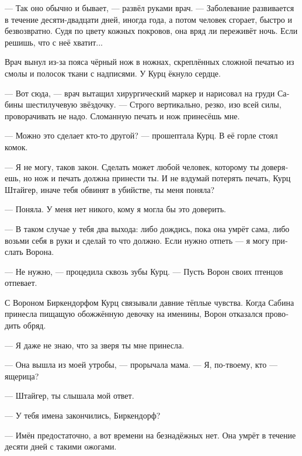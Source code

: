\documentclass[a4paper,12pt,fleqn]{book}\usepackage{polyglossia}\setdefaultlanguage[babelshorthands=true]{russian}\setotherlanguage{english}\defaultfontfeatures{Ligatures=TeX,Mapping=tex-text}\usepackage{xcolor}\newcommand{\ml}[3]{#2}
\begin{document}
--- Так оно обычно и бывает, --- развёл руками врач.
--- Заболевание развивается в течение десяти-двадцати дней, иногда года, а потом человек сгорает, быстро и безвозвратно.
Судя по цвету кожных покровов, она вряд ли переживёт ночь.
Если решишь, что с неё хватит...

Врач вынул из-за пояса чёрный нож в ножнах, скреплённых сложной печатью из смолы и полосок ткани с надписями.
У Курц ёкнуло сердце.

--- Вот сюда, --- врач вытащил хирургический маркер и нарисовал на груди Сабины шестилучевую звёздочку.
--- Строго вертикально, резко, изо всей силы, проворачивать не надо.
Сломанную печать и нож принесёшь мне.

--- Можно это сделает кто-то другой? --- прошептала Курц.
В её горле стоял комок.

--- Я не могу, таков закон.
Сделать может любой человек, которому ты доверяешь, но нож и печать должна принести ты.
И не вздумай потерять печать, Курц Штайгер, иначе тебя обвинят в убийстве, ты меня поняла?

--- Поняла.
У меня нет никого, кому я могла бы это доверить.

--- В таком случае у тебя два выхода: либо дождись, пока она умрёт сама, либо возьми себя в руки и сделай то что должно.
\ml{$0$}
{Если нужно отпеть --- я могу прислать Ворона.}
{If she needs last rites, I'll send the Raben.''}

--- Не нужно, --- процедила сквозь зубы Курц.
\ml{$0$}
{--- Пусть Ворон своих птенцов отпевает.}
{``Let the Raben give last rites to his birdlings.''}

С Вороном Биркендорфом Курц связывали давние тёплые чувства.
Когда Сабина принесла пищащую обожжённую девочку на именины, Ворон отказался проводить обряд.

--- Я даже не знаю, что за зверя ты мне принесла.

\ml{$0$}
{--- Она вышла из моей утробы, --- прорычала мама.}
{``She came out of my womb,'' mama growled.}
\ml{$0$}
{--- Я, по-твоему, кто --- ящерица?}
{``Who do you think I am---a lizard?''}

\ml{$0$}
{--- Штайгер, ты слышала мой ответ.}
{``Steiger, you heard my answer.''}

\ml{$0$}
{--- У тебя имена закончились, Биркендорф?}
{``Are you out of names, Birkendorf?''}

\ml{$0$}
{--- Имён предостаточно, а вот времени на безнадёжных нет.}
{``I have plenty of names, I'm out of time for a lost cause.}
\ml{$0$}
{Она умрёт в течение десяти дней с такими ожогами.}
{She'll die in ten days with burns like those.''}
\end{document}
